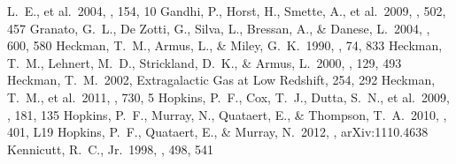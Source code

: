 \documentclass[apj]{emulateapj}
\begin{document}
\begin{thebibliography}{}
  L.~E., et al.\ 2004, \apjs, 154, 10
 Gandhi, P., Horst, H., Smette,
  A., et al.\ 2009, \aap, 502, 457
 Granato, G.~L., De Zotti, G.,
  Silva, L., Bressan, A., \& Danese, L.\ 2004, \apj, 600, 580
 Heckman, T.~M., Armus, L., \&
  Miley, G.~K.\ 1990, \apjs, 74, 833
 Heckman, T.~M., Lehnert, M.~D.,
  Strickland, D.~K., \& Armus, L.\ 2000, \apjs, 129, 493
 Heckman, T.~M.\ 2002, Extragalactic Gas
  at Low Redshift, 254, 292
 Heckman, T.~M., et al.\ 2011,
  \apj, 730, 5
 Hopkins, P.~F., Cox, T.~J.,
  Dutta, S.~N., et al.\ 2009, \apjs, 181, 135
 Hopkins, P.~F., Murray, N.,
  Quataert, E., \& Thompson, T.~A.\ 2010, \mnras, 401, L19
 Hopkins, P.~F., Quataert, E., \&
  Murray, N.\ 2012, \mnras, arXiv:1110.4638
 Kennicutt, R.~C., Jr.\ 1998, \apj,
  498, 541

\end{thebibliography}
\end{document}
